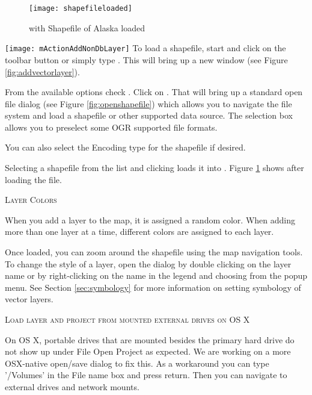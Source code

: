 \begin{figure}[ht]
   \centering
   \texttt{[image: shapefileloaded]}
   \caption{\qg with Shapefile of Alaska loaded \nixcaption}\label{fig:loadedshapefile}
\end{figure}

\texttt{[image: mActionAddNonDbLayer]} To load a shapefile, start
\qg and click on the 
toolbar button or simply type .
This will bring up a new window (see Figure \ref{fig:addvectorlayer}).

From the available options check . Click on .
That will bring up a standard open file dialog (see Figure
\ref{fig:openshapefile}) which allows you to navigate the file system and load
a shapefile or other supported data source.
The selection box  allows you to preselect 
some OGR supported file formats.

You can also select the Encoding type for the shapefile if desired.

Selecting a shapefile from the list and clicking  loads it into 
\qg. Figure \ref{fig:loadedshapefile} shows \qg after loading the 
 file.


\begin{Tip}\caption{\textsc{Layer Colors}}
When you add a layer to the map, it is assigned a random color. When
adding more than one layer at a time, different colors are assigned to each layer.
\end{Tip}

Once loaded, you can zoom around the shapefile using the map navigation tools.
To change the style of a layer, open the  dialog by double
clicking on the layer name or by right-clicking on the name in the legend and
choosing  from the popup menu. See
Section \ref{sec:symbology} for more information on setting symbology of
vector layers.

\begin{Tip}\caption{\textsc{Load layer and project from mounted external
drives on OS X}}
On OS X, portable drives that are mounted besides the primary hard
drive do not show up under File \arrow Open Project as expected. We are working
on a more OSX-native open/save dialog to fix this. As a workaround you can
type '/Volumes' in the File name box and press return. Then you can navigate
to external drives and network mounts.
\end{Tip}


